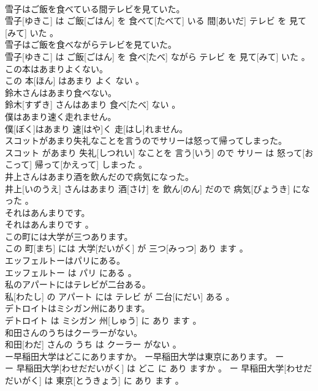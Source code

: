 \documentclass[8pt]{extreport}
\begin{document}
\begin{CJK}{UTF8}{min}
\\	雪子はご飯を食べている間テレビを見ていた。	
\\	雪子[ゆきこ] は ご飯[ごはん] を 食べて[たべて] いる 間[あいだ] テレビ を 見て[みて] いた 。
\\	雪子はご飯を食べながらテレビを見ていた。	
\\	雪子[ゆきこ] は ご飯[ごはん] を 食べ[たべ] ながら テレビ を 見て[みて] いた 。
\\	この本はあまりよくない。	
\\	この 本[ほん] はあまり よく ない 。
\\	鈴木さんはあまり食べない。	
\\	鈴木[すずき] さんはあまり 食べ[たべ] ない 。
\\	僕はあまり速く走れません。	
\\	僕[ぼく]はあまり 速[はや]く 走[はし]れません。
\\	スコットがあまり失礼なことを言うのでサリーは怒って帰ってしまった。	
\\	スコット があまり 失礼[しつれい] なことを 言う[いう] ので サリー は 怒って[おこって] 帰って[かえって] しまった 。
\\	井上さんはあまり酒を飲んだので病気になった。	
\\	井上[いのうえ] さんはあまり 酒[さけ] を 飲ん[のん] だので 病気[びょうき] になった 。
\\	それはあんまりです。	
\\	それはあんまりです 。
\\	この町には大学が三つあります。	
\\	この 町[まち] には 大学[だいがく] が 三つ[みっつ] あり ます 。
\\	エッフェルトーはパリにある。	
\\	エッフェルトー は パリ にある 。
\\	私のアパートにはテレビが二台ある。	
\\	私[わたし] の アパート には テレビ が 二台[にだい] ある 。
\\	デトロイトはミシガン州にあります。	
\\	デトロイト は ミシガン 州[しゅう] に あり ます 。
\\	和田さんのうちはクーラーがない。	
\\	和田[わだ] さんの うち は クーラー がない 。
\\	ー早稲田大学はどこにありますか。 ー早稲田大学は東京にあります。	ー
\\	ー 早稲田大学[わせだだいがく] は どこ に あり ますか 。 ー 早稲田大学[わせだだいがく] は 東京[とうきょう] に あり ます 。

\end{CJK}
\end{document}
